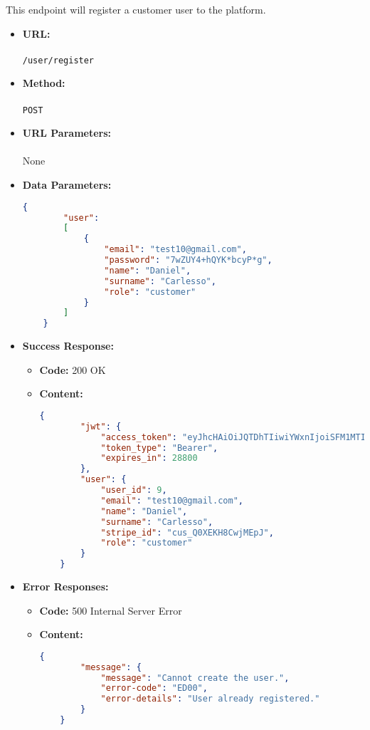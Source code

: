

This endpoint will register a customer user to the platform.

\begin{itemize}
    \item \textbf{URL:} \\\\\texttt{/user/register}
    \item \textbf{Method:} \\\\\texttt{POST}
    \item \textbf{URL Parameters:} \\\\None
    \item \textbf{Data Parameters:}
	\begin{lstlisting}[language=json]
    {
        "user":
        [   
            {
                "email": "test10@gmail.com",
                "password": "7wZUY4+hQYK*bcyP*g",
                "name": "Daniel",
                "surname": "Carlesso",
                "role": "customer"
            }
        ]
    }
	\end{lstlisting}
    \item \textbf{Success Response:}
		\begin{itemize}
			\item[$\circ$] \textbf{Code:} 200 OK
			\item[] \textbf{Content:}
			\begin{lstlisting}[language=json]
    {
        "jwt": {
            "access_token": "eyJhcHAiOiJQTDhTIiwiYWxnIjoiSFM1MTIifQ.eyJ1aWQiOjksInJvbCI6ImN1c3 RvbWVyIiwic3RyIjoiY3VzX1EwWEVLSDhDd2pNRXBKIiwiZGF0IjoxNzE0MzMzNDg1 MTc0fQ.vNtpcCGGvfoikd6yvy4bORjgUq2Q9bqMnI-1F4duXLoNv _5itOah3WaEnf Rtst0leH0oBs7Y5GEQ75NpWMmngA",
            "token_type": "Bearer",
            "expires_in": 28800
        },
        "user": {
            "user_id": 9,
            "email": "test10@gmail.com",
            "name": "Daniel",
            "surname": "Carlesso",
            "stripe_id": "cus_Q0XEKH8CwjMEpJ",
            "role": "customer"
        }
    }
			\end{lstlisting}
		\end{itemize}
	   \item \textbf{Error Responses:}
    
    	\begin{itemize}
			\item[$\circ$] \textbf{Code:} 500 Internal Server Error
			\item[] \textbf{Content:}
			\begin{lstlisting}[language=json]
    {
        "message": {
            "message": "Cannot create the user.",
            "error-code": "ED00",
            "error-details": "User already registered."
        }
    }
			\end{lstlisting}


\end{itemize}
\end{itemize}
